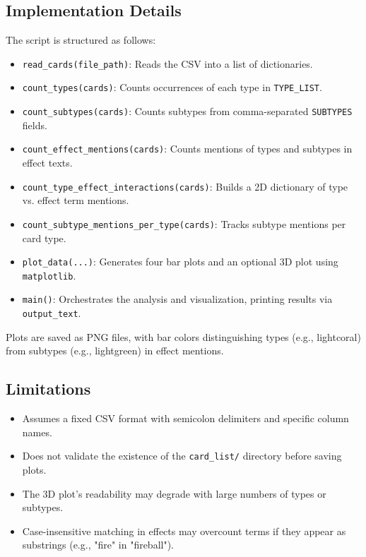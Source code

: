 \subsection{Implementation Details}
The script is structured as follows:
\begin{itemize}
	\item \texttt{read\_cards(file\_path)}: Reads the CSV into a list of dictionaries.
	\item \texttt{count\_types(cards)}: Counts occurrences of each type in \texttt{TYPE\_LIST}.
	\item \texttt{count\_subtypes(cards)}: Counts subtypes from comma-separated \texttt{SUBTYPES} fields.
	\item \texttt{count\_effect\_mentions(cards)}: Counts mentions of types and subtypes in effect texts.
	\item \texttt{count\_type\_effect\_interactions(cards)}: Builds a 2D dictionary of type vs. effect term mentions.
	\item \texttt{count\_subtype\_mentions\_per\_type(cards)}: Tracks subtype mentions per card type.
	\item \texttt{plot\_data(...)}: Generates four bar plots and an optional 3D plot using \texttt{matplotlib}.
	\item \texttt{main()}: Orchestrates the analysis and visualization, printing results via \texttt{output\_text}.
\end{itemize}
Plots are saved as PNG files, with bar colors distinguishing types (e.g., lightcoral) from subtypes (e.g., lightgreen) in effect mentions.

\subsection{Limitations}
\begin{itemize}
	\item Assumes a fixed CSV format with semicolon delimiters and specific column names.
	\item Does not validate the existence of the \texttt{card\_list/} directory before saving plots.
	\item The 3D plot’s readability may degrade with large numbers of types or subtypes.
	\item Case-insensitive matching in effects may overcount terms if they appear as substrings (e.g., "fire" in "fireball").
\end{itemize}








